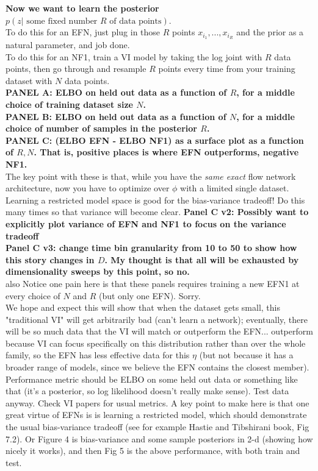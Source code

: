 \documentclass{article}
\begin{document}
{\bf Now we want to learn the posterior $p(z | \textrm{ some fixed number $R$ of data points})$}.  \\
To do this for an EFN, just plug in those $R$ points $x_{i_1},...,x_{i_R}$ and the prior as a natural parameter, and job done. \\
To do this for an NF1, train a VI model by taking the log joint with $R$ data points, then go through and resample $R$ points every time from your training dataset with $N$ data points. \\
{\bf PANEL A: ELBO on held out data as a function of $R$, for a middle choice of training dataset size $N$.} \\ 
{\bf PANEL B: ELBO on held out data as a function of $N$, for a middle choice of number of samples in the posterior $R$.} \\
{\bf PANEL C: (ELBO EFN - ELBO NF1) as a surface plot as a function of $R,N$.  That is, positive places is where EFN outperforms, negative NF1.} \\  
The key point with these is that, while you have the \emph{same exact} flow network architecture, now you have to optimize over $\phi$ with a limited single dataset.  Learning a restricted model space is good for the bias-variance tradeoff!  Do this many times so that variance will become clear.  
{\bf Panel C v2: Possibly want to explicitly plot variance of EFN and NF1 to focus on the variance tradeoff}\\
{\bf Panel C v3: change time bin granularity from 10 to 50 to show how this story changes in $D$.  My thought is that all will be exhausted by dimensionality sweeps by this point, so no.}\\
 also Notice one pain here is that these panels requires training a new EFN1 at every choice of $N$ and $R$ (but only one EFN).  Sorry. \\


We hope and expect this will show that when the dataset gets small, this "traditional VI" will get arbitrarily bad (can't learn a network); eventually, there will be so much data that the VI will match or outperform the EFN... outperform because VI can focus specifically on this distribution rather than over the whole family, so the EFN has less effective data for this $\eta$ (but not because it has a broader range of models, since we believe the EFN contains the closest member).  Performance metric should be ELBO on some held out data or something like that (it's a posterior, so log likelihood doesn't really make sense).  Test data anyway.   Check VI papers for usual metrics.  A key point to make here is that one great virtue of EFNs is is learning a restricted model, which should demonstrate the usual bias-variance tradeoff (see for example Hastie and Tibshirani book, Fig 7.2). Or Figure 4 is bias-variance and some sample posteriors in 2-d (showing how nicely it works), and then Fig 5 is the above performance, with both train and test.   
\end{document}
